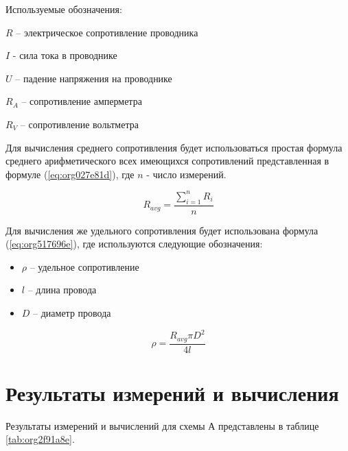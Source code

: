 \documentclass[14pt]{extarticle}
\begin{document}
Используемые обозначения:

\(R\) -- электрическое сопротивление проводника

\(I\) - сила тока в проводнике

\(U\) -- падение напряжения на проводнике

\(R_A\) -- сопротивление амперметра 

\(R_V\) -- сопротивление вольтметра

Для вычисления среднего сопротивления будет использоваться простая
формула среднего арифметического всех имеющихся сопротивлений
представленная в формуле (\ref{eq:org027e81d}), где \(n\) - число измерений.


\begin{equation}
\label{eq:org027e81d}
R_{avg} = \frac{\sum\limits_{i = 1}^{n} R_i}{n}
\end{equation}

Для вычисления же удельного сопротивления будет использована формула (\ref{eq:org517696e}),
где используются следующие обозначения:

\begin{itemize}
\item \(\rho\) -- удельное сопротивление
\item \(l\) -- длина провода
\item \(D\) -- диаметр провода
\end{itemize}

\begin{equation}
\label{eq:org517696e}
\rho = \frac{R_{avg} \pi D^2}{4l}
\end{equation}

\section{Результаты измерений и вычисления}
\label{sec:org9f336b6}

Результаты измерений и вычислений для схемы А представлены в таблице \ref{tab:org2f91a8e}.
\end{document}
